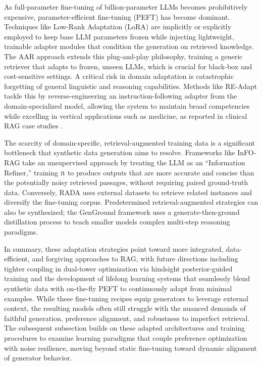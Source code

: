 \documentclass[11pt,a4paper]{article}
\begin{document}
As full-parameter fine-tuning of billion-parameter LLMs becomes prohibitively expensive, parameter-efficient fine-tuning (PEFT) has become dominant. Techniques like Low-Rank Adaptation (LoRA) are implicitly or explicitly employed to keep base LLM parameters frozen while injecting lightweight, trainable adapter modules that condition the generation on retrieved knowledge. The AAR approach \cite{arxiv:2305.17331v1} extends this plug-and-play philosophy, training a generic retriever that adapts to frozen, unseen LLMs, which is crucial for black-box and cost-sensitive settings. A critical risk in domain adaptation is catastrophic forgetting of general linguistic and reasoning capabilities. Methods like RE-Adapt tackle this by reverse-engineering an instruction-following adapter from the domain-specialized model, allowing the system to maintain broad competencies while excelling in vertical applications such as medicine, as reported in clinical RAG case studies \cite{arxiv:2402.01733v1}.

The scarcity of domain-specific, retrieval-augmented training data is a significant bottleneck that synthetic data generation aims to resolve. Frameworks like InFO-RAG \cite{arxiv:2402.18150v1} take an unsupervised approach by treating the LLM as an ``Information Refiner,'' training it to produce outputs that are more accurate and concise than the potentially noisy retrieved passages, without requiring paired ground-truth data. Conversely, RADA uses external datasets to retrieve related instances and diversify the fine-tuning corpus. Predetermined retrieval-augmented strategies can also be synthesized; the GenGround framework \cite{arxiv:2406.14891v2} uses a generate-then-ground distillation process to teach smaller models complex multi-step reasoning paradigms.

In summary, these adaptation strategies point toward more integrated, data-efficient, and forgiving approaches to RAG, with future directions including tighter coupling in dual-tower optimization via hindsight posterior-guided training \cite{arxiv:2110.07752v2} and the development of lifelong learning systems that seamlessly blend synthetic data with on-the-fly PEFT to continuously adapt from minimal examples. While these fine-tuning recipes equip generators to leverage external context, the resulting models often still struggle with the nuanced demands of faithful generation, preference alignment, and robustness to imperfect retrieval. The subsequent subsection builds on these adapted architectures and training procedures to examine learning paradigms that couple preference optimization with noise resilience, moving beyond static fine-tuning toward dynamic alignment of generator behavior.
\end{document}
